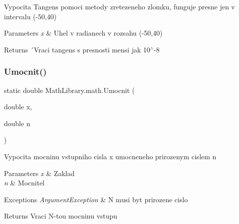 Vypocita Tangens pomoci metody zretezeneho zlomku, funguje presne jen v intervalu (-\/50,40) 


\begin{DoxyParams}{Parameters}
{\em x} & Uhel v radianech v rozsahu (-\/50,40)\\
\hline
\end{DoxyParams}
\begin{DoxyReturn}{Returns}
´\+Vraci tangens s presnosti mensi jak 10$^\wedge$-\/8
\end{DoxyReturn}
\mbox{\label{class_math_library_1_1math_a4e4be4de44305ffd1bd15db33fb26e3a}} 
\subsubsection{\texorpdfstring{Umocnit()}{Umocnit()}}
{\footnotesize\ttfamily static double Math\+Library.\+math.\+Umocnit (\begin{DoxyParamCaption}\item[{double}]{x,  }\item[{double}]{n }\end{DoxyParamCaption})\hspace{0.3cm}{\ttfamily [static]}}



Vypocita mocninu vstupniho cisla x umocneneho prirozenym cislem n 


\begin{DoxyParams}{Parameters}
{\em x} & Zaklad\\
\hline
{\em n} & Mocnitel\\
\hline
\end{DoxyParams}

\begin{DoxyExceptions}{Exceptions}
{\em Argument\+Exception} & N musi byt prirozene cislo\\
\hline
\end{DoxyExceptions}
\begin{DoxyReturn}{Returns}
Vraci N-\/tou mocninu vstupu
\end{DoxyReturn}
\mbox{\label{class_math_library_1_1math_a4f3512b2dcb484d8b579274c5813f706}} 
